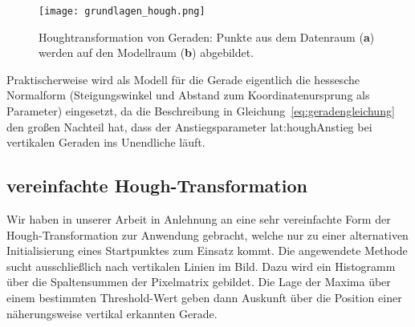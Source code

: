 \begin{figure}[H] %
  \centering
  \texttt{[image: grundlagen\_hough.png]}
  \caption{Houghtransformation von Geraden: Punkte aus dem Datenraum (\textbf{a}) werden auf den Modellraum (\textbf{b}) abgebildet.}
\end{figure} 

Praktischerweise wird als Modell für die Gerade eigentlich die hessesche Normalform (Steigungswinkel und Abstand zum Koordinatenursprung als Parameter) eingesetzt, da die Beschreibung in Gleichung~\ref{eq:geradengleichung} den großen Nachteil hat, dass der Anstiegsparameter \gls{lat:houghAnstieg} bei vertikalen Geraden ins Unendliche läuft. 

\subsection{vereinfachte Hough-Transformation}
\label{ssec:grundlagen:hough:vereinfachte}
Wir haben in unserer Arbeit in Anlehnung an \autocite{alyRealTimeDetection2008} eine sehr vereinfachte Form der Hough-Transformation zur Anwendung gebracht, welche nur zu einer alternativen Initialisierung eines Startpunktes zum Einsatz kommt. Die angewendete Methode sucht ausschließlich nach vertikalen Linien im Bild. Dazu wird ein Histogramm über die Spaltensummen der Pixelmatrix gebildet. Die Lage der Maxima über einem bestimmten Threshold-Wert geben dann Auskunft über die Position einer näherungsweise vertikal erkannten Gerade.